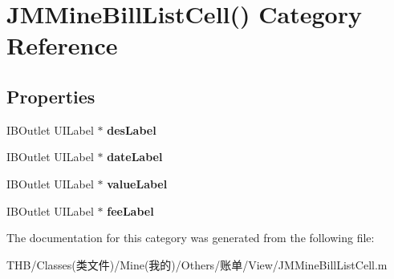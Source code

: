 \hypertarget{category_j_m_mine_bill_list_cell_07_08}{}\section{J\+M\+Mine\+Bill\+List\+Cell() Category Reference}
\label{category_j_m_mine_bill_list_cell_07_08}
\subsection*{Properties}
\begin{DoxyCompactItemize}
\item 
\mbox{\label{category_j_m_mine_bill_list_cell_07_08_a919eac00da3be5027001a9e6b6d29982}} 
I\+B\+Outlet U\+I\+Label $\ast$ {\bfseries des\+Label}
\item 
\mbox{\label{category_j_m_mine_bill_list_cell_07_08_a75b1a5fc6ec3b74d369253301fdb39e3}} 
I\+B\+Outlet U\+I\+Label $\ast$ {\bfseries date\+Label}
\item 
\mbox{\label{category_j_m_mine_bill_list_cell_07_08_a0cb7c0e2044ca9de7720d8d1e9e1775c}} 
I\+B\+Outlet U\+I\+Label $\ast$ {\bfseries value\+Label}
\item 
\mbox{\label{category_j_m_mine_bill_list_cell_07_08_a46260abce881595d99fbdc95e6abfb3f}} 
I\+B\+Outlet U\+I\+Label $\ast$ {\bfseries fee\+Label}
\end{DoxyCompactItemize}


The documentation for this category was generated from the following file\+:\begin{DoxyCompactItemize}
\item 
T\+H\+B/\+Classes(类文件)/\+Mine(我的)/\+Others/账单/\+View/J\+M\+Mine\+Bill\+List\+Cell.\+m\end{DoxyCompactItemize}
